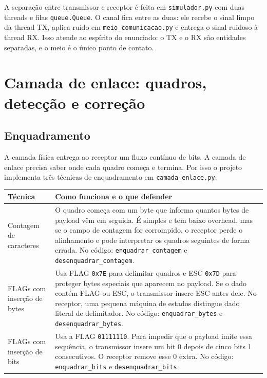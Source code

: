 \documentclass[10pt,a4paper]{article}
\newcommand{\arquivo}[1]{\texttt{#1}}
\newcommand{\codigo}[1]{\texttt{#1}}
\begin{document}
A separação entre transmissor e receptor é feita em \arquivo{simulador.py} com duas threads e filas \codigo{queue.Queue}. O canal fica entre as duas: ele recebe o sinal limpo da thread TX, aplica ruído em \arquivo{meio\_comunicacao.py} e entrega o sinal ruidoso à thread RX. Isso atende ao espírito do enunciado: o TX e o RX são entidades separadas, e o meio é o único ponto de contato.

\section{Camada de enlace: quadros, detecção e correção}

\subsection{Enquadramento}

A camada física entrega ao receptor um fluxo contínuo de bits. A camada de enlace precisa saber onde cada quadro começa e termina. Por isso o projeto implementa três técnicas de enquadramento em \arquivo{camada\_enlace.py}.

\begin{center}
\small
\begin{tabularx}{\linewidth}{p{2.9cm}Y}
\toprule
\textbf{Técnica} & \textbf{Como funciona e o que defender} \\
\midrule
Contagem de caracteres & O quadro começa com um byte que informa quantos bytes de payload vêm em seguida. É simples e tem baixo overhead, mas se o campo de contagem for corrompido, o receptor perde o alinhamento e pode interpretar os quadros seguintes de forma errada. No código: \codigo{enquadrar\_contagem} e \codigo{desenquadrar\_contagem}. \\
FLAGs com inserção de bytes & Usa FLAG \codigo{0x7E} para delimitar quadros e ESC \codigo{0x7D} para proteger bytes especiais que aparecem no payload. Se o dado contém FLAG ou ESC, o transmissor insere ESC antes dele. No receptor, uma pequena máquina de estados distingue dado literal de delimitador. No código: \codigo{enquadrar\_bytes} e \codigo{desenquadrar\_bytes}. \\
FLAGs com inserção de bits & Usa a FLAG \codigo{01111110}. Para impedir que o payload imite essa sequência, o transmissor insere um bit 0 depois de cinco bits 1 consecutivos. O receptor remove esse 0 extra. No código: \codigo{enquadrar\_bits} e \codigo{desenquadrar\_bits}. \\
\bottomrule
\end{tabularx}
\end{center}
\end{document}
